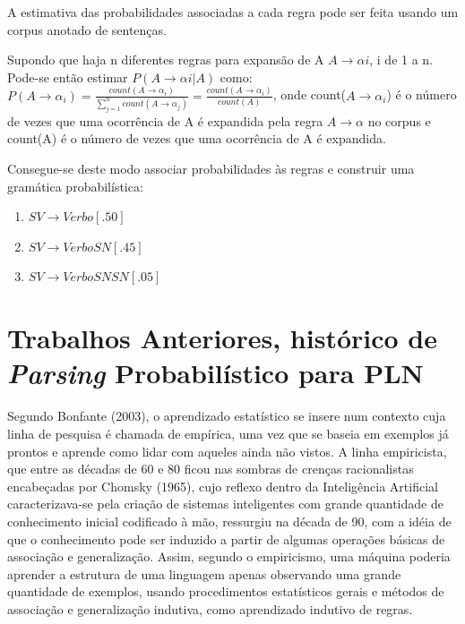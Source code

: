 A estimativa das probabilidades associadas a cada regra pode ser feita usando um corpus anotado de sentenças.



Supondo que haja n diferentes regras para expansão de A $A \rightarrow \alpha i $, i de 1 a n.
\\
Pode-se então estimar $P(A \rightarrow \alpha i|A)$ como:
\\

$ P(A \rightarrow \alpha_i) = \frac{count(A \rightarrow \alpha_i)}{\sum_{j=1}^n count(A \rightarrow \alpha_j)} = \frac{count(A \rightarrow \alpha_i)}{count(A)} $, onde count($A \rightarrow \alpha_i$) é o número de vezes que uma ocorrência de A é expandida pela regra $A \rightarrow \alpha$ no corpus e count(A) é o número de vezes que uma ocorrência de A é expandida.


Consegue-se deste modo associar probabilidades às regras e construir uma gramática probabilística:

\begin{enumerate}
  \item  $SV \rightarrow Verbo [.50]$
  \item  $SV \rightarrow Verbo SN [.45]$
  \item  $SV \rightarrow Verbo SN SN [.05]$
\end{enumerate}



\section{Trabalhos Anteriores, histórico de \emph{Parsing} Probabilístico para PLN }
\label{sec:trab_anter}

Segundo Bonfante (2003), o aprendizado estatístico se insere num contexto cuja linha de pesquisa é chamada de empírica, uma vez que se baseia em exemplos já prontos e aprende como lidar com aqueles ainda não vistos. A linha empiricista, que entre as décadas de 60 e 80 ficou nas sombras de crenças racionalistas encabeçadas por Chomsky (1965), cujo reflexo dentro da Inteligência Artificial caracterizava-se pela criação de sistemas inteligentes com grande quantidade de conhecimento inicial codificado à mão, ressurgiu na década de 90, com a idéia de que o conhecimento pode ser induzido a partir de algumas operações básicas de associação e generalização. Assim, segundo o empiricismo, uma máquina poderia aprender a estrutura de uma linguagem apenas observando uma grande quantidade de exemplos, usando procedimentos estatísticos gerais e métodos de associação e generalização indutiva, como aprendizado indutivo de regras.


